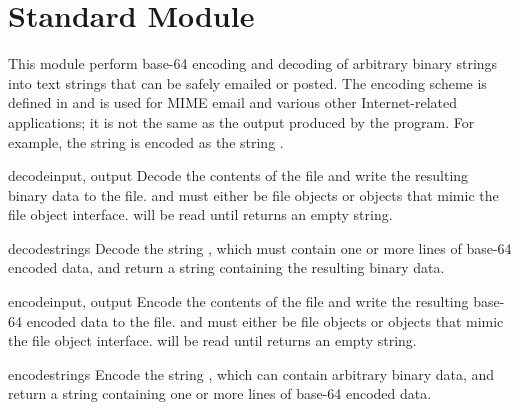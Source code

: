 \section{Standard Module }
\label{module-base64}

This module perform base-64 encoding and decoding of arbitrary binary
strings into text strings that can be safely emailed or posted.  The
encoding scheme is defined in  and is used for MIME email and
various other Internet-related applications; it is not the same as the
output produced by the  program.  For example, the
string  is encoded as the string
.  

\renewcommand{\indexsubitem}{(in module base64)}

\begin{funcdesc}{decode}{input, output}
Decode the contents of the  file and write the resulting
binary data to the  file.
 and  must either be file objects or objects that
mimic the file object interface.  will be read until
 returns an empty string.
\end{funcdesc}

\begin{funcdesc}{decodestring}{s}
Decode the string , which must contain one or more lines of
base-64 encoded data, and return a string containing the resulting
binary data.
\end{funcdesc}

\begin{funcdesc}{encode}{input, output}
Encode the contents of the  file and write the resulting
base-64 encoded data to the  file.
 and  must either be file objects or objects that
mimic the file object interface.  will be read until
 returns an empty string.
\end{funcdesc}

\begin{funcdesc}{encodestring}{s}
Encode the string , which can contain arbitrary binary data,
and return a string containing one or more lines of
base-64 encoded data.
\end{funcdesc}


